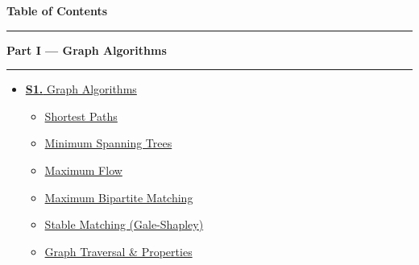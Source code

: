 \documentclass[12pt]{article}
\begin{document}
\thispagestyle{fancy}
\begin{center}
  {\LARGE\bfseries\textcolor{pblue}{Table of Contents}}\\[6pt]
  \textcolor{pblue}{\rule{0.6\textwidth}{0.8pt}}
\end{center}
\vspace{6pt}

\begin{tcolorbox}[breakable,colback=cA!5,colframe=cA,boxrule=1pt,arc=5pt,
  left=8pt,right=8pt,top=8pt,bottom=8pt,before skip=4pt]
  {\large\bfseries\textcolor{cA}{Part I --- Graph Algorithms}}\par\smallskip
  \noindent\textcolor{cA!40}{\rule{\textwidth}{0.4pt}}\par\smallskip
  \small\begin{itemize}[leftmargin=1.2em,itemsep=1pt,label={\textcolor{cA}{$\triangleright$}}]
    \item \hyperref[sec:S1]{\textbf{S1.} Graph Algorithms}
      \begin{itemize}[leftmargin=1.5em,itemsep=0pt,label={\textcolor{cA}{$\cdot$}}]
        \item \hyperref[sub:s1-shortestpaths]{Shortest Paths}
        \item \hyperref[sub:s1-mst]{Minimum Spanning Trees}
        \item \hyperref[sub:s1-maxflow]{Maximum Flow}
        \item \hyperref[sub:s1-bipartite]{Maximum Bipartite Matching}
        \item \hyperref[sub:s1-stablematching]{Stable Matching (Gale-Shapley)}
        \item \hyperref[sub:s1-traversal]{Graph Traversal \& Properties}
      \end{itemize}
  \end{itemize}
\end{tcolorbox}
\end{document}
